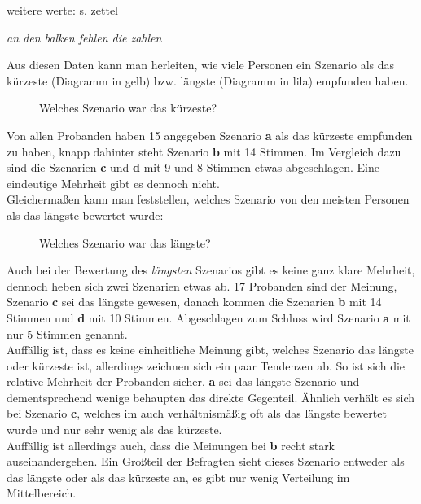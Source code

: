 \documentclass{Paper}
\begin{document}
weitere werte: s. zettel

\textit{an den balken fehlen die zahlen}

	
Aus diesen Daten kann man herleiten, wie viele Personen ein Szenario als das kürzeste (Diagramm in gelb) bzw. längste (Diagramm in lila) empfunden haben. 

\begin{figure}[ht]
\caption{Welches Szenario war das kürzeste?}
\end{figure}
	
Von allen Probanden haben 15 angegeben Szenario \textbf{a} als das kürzeste empfunden zu haben, knapp dahinter steht Szenario \textbf{b} mit 14 Stimmen. Im Vergleich dazu sind die Szenarien \textbf{c} und \textbf{d} mit 9 und 8 Stimmen etwas abgeschlagen. Eine eindeutige Mehrheit gibt es dennoch nicht.\\
Gleichermaßen kann man feststellen, welches Szenario von den meisten Personen als das längste bewertet wurde:

\begin{figure}[ht]
\caption{Welches Szenario war das längste?}
\end{figure}	

Auch bei der Bewertung des \textit{längsten} Szenarios gibt es keine ganz klare Mehrheit, dennoch heben sich zwei Szenarien etwas ab. 17 Probanden sind der Meinung, Szenario \textbf{c} sei das längste gewesen, danach kommen die Szenarien \textbf{b} mit 14 Stimmen und \textbf{d} mit 10 Stimmen. Abgeschlagen zum Schluss wird Szenario \textbf{a} mit nur 5 Stimmen genannt.\\
Auffällig ist, dass es keine einheitliche Meinung gibt, welches Szenario das längste oder kürzeste ist, allerdings zeichnen sich ein paar Tendenzen ab. So ist sich die relative Mehrheit der Probanden sicher, \textbf{a} sei das längste Szenario und dementsprechend wenige behaupten das direkte Gegenteil. Ähnlich verhält es sich bei Szenario \textbf{c}, welches im auch verhältnismäßig oft als das längste bewertet wurde und nur sehr wenig als das kürzeste.\\
Auffällig ist allerdings auch, dass die Meinungen bei \textbf{b} recht stark auseinandergehen. Ein Großteil der Befragten sieht dieses Szenario entweder als das längste oder als das kürzeste an, es gibt nur wenig Verteilung im Mittelbereich.
	
\end{document}
